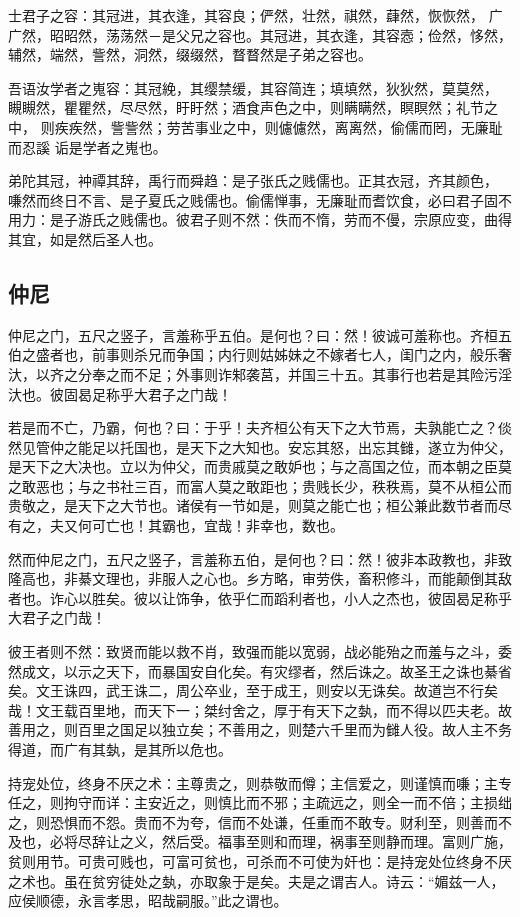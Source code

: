 \documentclass[]{article}
\begin{document}
士君子之容：其冠进，其衣逢，其容良；俨然，壮然，祺然，蕼然，恢恢然，
广广然，昭昭然，荡荡然－是父兄之容也。其冠进，其衣逢，其容悫；俭然，恀然，
辅然，端然，訾然，洞然，缀缀然，瞀瞀然是子弟之容也。

吾语汝学者之嵬容：其冠絻，其缨禁缓，其容简连；填填然，狄狄然，莫莫然，
瞡瞡然，瞿瞿然，尽尽然，盱盱然；酒食声色之中，则瞒瞒然，瞑瞑然；礼节之中，
则疾疾然，訾訾然；劳苦事业之中，则儢儢然，离离然，偷儒而罔，无廉耻而忍謑
诟是学者之嵬也。

弟陀其冠，衶禫其辞，禹行而舜趋：是子张氏之贱儒也。正其衣冠，齐其颜色，
嗛然而终日不言、是子夏氏之贱儒也。偷儒惮事，无廉耻而耆饮食，必曰君子固不
用力：是子游氏之贱儒也。彼君子则不然：佚而不惰，劳而不僈，宗原应变，曲得
其宜，如是然后圣人也。

\hypertarget{header-n36}{%
\subsection{仲尼}\label{header-n36}}

仲尼之门，五尺之竖子，言羞称乎五伯。是何也？曰：然！彼诚可羞称也。齐桓五伯之盛者也，前事则杀兄而争国；内行则姑姊妹之不嫁者七人，闺门之内，般乐奢汏，以齐之分奉之而不足；外事则诈邾袭莒，并国三十五。其事行也若是其险污淫汏也。彼固曷足称乎大君子之门哉！

若是而不亡，乃霸，何也？曰：于乎！夫齐桓公有天下之大节焉，夫孰能亡之？倓然见管仲之能足以托国也，是天下之大知也。安忘其怒，出忘其雠，遂立为仲父，是天下之大决也。立以为仲父，而贵戚莫之敢妒也；与之高国之位，而本朝之臣莫之敢恶也；与之书社三百，而富人莫之敢距也；贵贱长少，秩秩焉，莫不从桓公而贵敬之，是天下之大节也。诸侯有一节如是，则莫之能亡也；桓公兼此数节者而尽有之，夫又何可亡也！其霸也，宜哉！非幸也，数也。

然而仲尼之门，五尺之竖子，言羞称五伯，是何也？曰：然！彼非本政教也，非致隆高也，非綦文理也，非服人之心也。乡方略，审劳佚，畜积修斗，而能颠倒其敌者也。诈心以胜矣。彼以让饰争，依乎仁而蹈利者也，小人之杰也，彼固曷足称乎大君子之门哉！

彼王者则不然：致贤而能以救不肖，致强而能以宽弱，战必能殆之而羞与之斗，委然成文，以示之天下，而暴国安自化矣。有灾缪者，然后诛之。故圣王之诛也綦省矣。文王诛四，武王诛二，周公卒业，至于成王，则安以无诛矣。故道岂不行矣哉！文王载百里地，而天下一；桀纣舍之，厚于有天下之埶，而不得以匹夫老。故善用之，则百里之国足以独立矣；不善用之，则楚六千里而为雠人役。故人主不务得道，而广有其埶，是其所以危也。

持宠处位，终身不厌之术：主尊贵之，则恭敬而僔；主信爱之，则谨慎而嗛；主专任之，则拘守而详：主安近之，则慎比而不邪；主疏远之，则全一而不倍；主损绌之，则恐惧而不怨。贵而不为夸，信而不处谦，任重而不敢专。财利至，则善而不及也，必将尽辞让之义，然后受。福事至则和而理，祸事至则静而理。富则广施，贫则用节。可贵可贱也，可富可贫也，可杀而不可使为奸也：是持宠处位终身不厌之术也。虽在贫穷徒处之埶，亦取象于是矣。夫是之谓吉人。诗云：``媚兹一人，应侯顺德，永言孝思，昭哉嗣服。''此之谓也。
\end{document}
